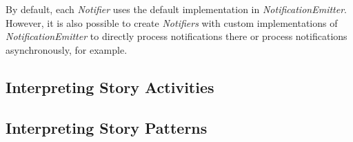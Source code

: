 By default, each \emph{Notifier} uses the default implementation in \emph{NotificationEmitter}. 
However, it is also possible to create \emph{Notifiers} with custom implementations of \emph{NotificationEmitter} to directly process notifications there or process notifications asynchronously, for example.


\subsection{Interpreting Story Activities}
%



\subsection{Interpreting Story Patterns}

